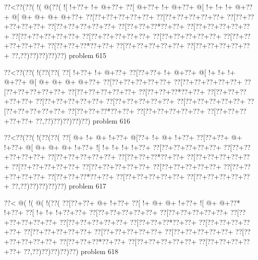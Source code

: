 \vbox{\vbox{\goo
\0??<\0??(\0??(\- !(\- @(\0??(
\- ![\- !+\0??+\- !+\- @+\0??+
\0??[\- @+\0??+\- !+\- @+\0??+
\- @[\- !+\- !+\- !+\- @+\0??+
\- @[\- @+\- @+\- @+\- @+\0??+
\0??[\0??+\0??+\0??+\0??+\0??+
\0??[\0??+\0??+\0??+\0??+\0??+
\0??[\0??+\0??+\0??+\0??+\0??+
\0??[\0??+\0??+\0??+\0??+\0??+
\0??[\0??+\0??+\0??*\0??+\0??+
\0??[\0??+\0??+\0??+\0??+\0??+
\0??[\0??+\0??+\0??+\0??+\0??+
\0??[\0??+\0??+\0??+\0??+\0??+
\0??[\0??+\0??+\0??+\0??+\0??+
\0??[\0??+\0??+\0??+\0??+\0??+
\0??[\0??+\0??+\0??*\0??+\0??+
\0??[\0??+\0??+\0??+\0??+\0??+
\0??[\0??+\0??+\0??+\0??+\0??+
\0??,\0??)\0??)\0??)\0??)\0??)
}
\hfil problem 615\hfil\break
}

\vbox{\vbox{\goo
\0??<\0??(\0??(\- !(\0??(\0??(
\0??[\- !+\0??+\- !+\- @+\0??+
\0??[\0??+\0??+\- !+\- @+\0??+
\- @[\- !+\- !+\- !+\- @+\0??+
\- @[\- @+\- @+\- @+\- @+\0??+
\0??[\0??+\0??+\0??+\0??+\0??+
\0??[\0??+\0??+\0??+\0??+\0??+
\0??[\0??+\0??+\0??+\0??+\0??+
\0??[\0??+\0??+\0??+\0??+\0??+
\0??[\0??+\0??+\0??*\0??+\0??+
\0??[\0??+\0??+\0??+\0??+\0??+
\0??[\0??+\0??+\0??+\0??+\0??+
\0??[\0??+\0??+\0??+\0??+\0??+
\0??[\0??+\0??+\0??+\0??+\0??+
\0??[\0??+\0??+\0??+\0??+\0??+
\0??[\0??+\0??+\0??*\0??+\0??+
\0??[\0??+\0??+\0??+\0??+\0??+
\0??[\0??+\0??+\0??+\0??+\0??+
\0??,\0??)\0??)\0??)\0??)\0??)
}
\hfil problem 616\hfil\break
}

\vbox{\vbox{\goo
\0??<\0??(\0??(\- !(\0??(\0??(
\0??[\- @+\- !+\- @+\- !+\0??+
\- @[\0??+\- !+\- @+\- !+\0??+
\0??[\0??+\0??+\- @+\- !+\0??+
\- @[\- @+\- @+\- @+\- !+\0??+
\- ![\- !+\- !+\- !+\- !+\0??+
\0??[\0??+\0??+\0??+\0??+\0??+
\0??[\0??+\0??+\0??+\0??+\0??+
\0??[\0??+\0??+\0??+\0??+\0??+
\0??[\0??+\0??+\0??*\0??+\0??+
\0??[\0??+\0??+\0??+\0??+\0??+
\0??[\0??+\0??+\0??+\0??+\0??+
\0??[\0??+\0??+\0??+\0??+\0??+
\0??[\0??+\0??+\0??+\0??+\0??+
\0??[\0??+\0??+\0??+\0??+\0??+
\0??[\0??+\0??+\0??*\0??+\0??+
\0??[\0??+\0??+\0??+\0??+\0??+
\0??[\0??+\0??+\0??+\0??+\0??+
\0??,\0??)\0??)\0??)\0??)\0??)
}
\hfil problem 617\hfil\break
}

\vbox{\vbox{\goo
\0??<\- @(\- !(\- @(\- !(\0??(
\0??[\0??+\0??+\- @+\- !+\0??+
\0??[\- !+\- @+\- @+\- !+\0??+
\- ![\- @+\- @+\0??*\- !+\0??+
\0??[\- !+\- !+\- !+\0??+\0??+
\0??[\0??+\0??+\0??+\0??+\0??+
\0??[\0??+\0??+\0??+\0??+\0??+
\0??[\0??+\0??+\0??+\0??+\0??+
\0??[\0??+\0??+\0??+\0??+\0??+
\0??[\0??+\0??+\0??*\0??+\0??+
\0??[\0??+\0??+\0??+\0??+\0??+
\0??[\0??+\0??+\0??+\0??+\0??+
\0??[\0??+\0??+\0??+\0??+\0??+
\0??[\0??+\0??+\0??+\0??+\0??+
\0??[\0??+\0??+\0??+\0??+\0??+
\0??[\0??+\0??+\0??*\0??+\0??+
\0??[\0??+\0??+\0??+\0??+\0??+
\0??[\0??+\0??+\0??+\0??+\0??+
\0??,\0??)\0??)\0??)\0??)\0??)
}
\hfil problem 618\hfil\break
}

